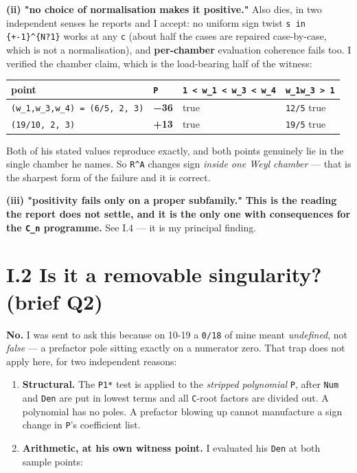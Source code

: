 \documentclass[11pt,a4paper]{article}
\begin{document}
\textbf{(ii) "no choice of normalisation makes it positive."} Also dies, in two independent senses he reports and I accept: no uniform sign twist \mbox{\texttt{s in \{+-1\}\textasciicircum{}\{N?1\}}} works at any \mbox{\texttt{c}} (about half the cases are repaired case-by-case, which is not a normalisation), and \textbf{per-chamber} evaluation coherence fails too. I verified the chamber claim, which is the load-bearing half of the witness:

\begin{center}\footnotesize
\begin{tabular}{@{}p{}p{}p{}p{}@{}}
\hline
\textbf{point} & \textbf{\mbox{\texttt{P}}} & \textbf{\mbox{\texttt{1 < w\_1 < w\_3 < w\_4}}} & \textbf{\mbox{\texttt{w\_1w\_3 > 1}}}\\ \hline
\mbox{\texttt{(w\_1,w\_3,w\_4) = (6/5, 2, 3)}} & \textbf{−36} & true & \mbox{\texttt{12/5}} true\\
\mbox{\texttt{(19/10, 2, 3)}} & \textbf{+13} & true & \mbox{\texttt{19/5}} true\\
\hline\end{tabular}\end{center}

Both of his stated values reproduce exactly, and both points genuinely lie in the single chamber he names. So \mbox{\texttt{R\textasciicircum{}A}} changes sign \emph{inside one Weyl chamber} --- that is the sharpest form of the failure and it is correct.

\textbf{(iii) "positivity fails only on a proper subfamily."} \textbf{This is the reading the report does not settle, and it is the only one with consequences for the \mbox{\texttt{C\_n}} programme.} See I.4 --- it is my principal finding.

\section*{I.2 Is it a removable singularity? (brief Q2)}

\textbf{No.} I was sent to ask this because on 10-19 a \mbox{\texttt{0/18}} of mine meant \emph{undefined}, not \emph{false} --- a prefactor pole sitting exactly on a numerator zero. That trap does not apply here, for two independent reasons:

\begin{enumerate}
\item \textbf{Structural.} The \mbox{\texttt{P1*}} test is applied to the \emph{stripped polynomial} \mbox{\texttt{P}}, after \mbox{\texttt{Num}} and \mbox{\texttt{Den}} are put in lowest terms and all \mbox{\texttt{C}}-root factors are divided out. A polynomial has no poles. A prefactor blowing up cannot manufacture a sign change in \mbox{\texttt{P}}'s coefficient list.
\item \textbf{Arithmetic, at his own witness point.} I evaluated his \mbox{\texttt{Den}} at both sample points:
\end{enumerate}
\end{document}
